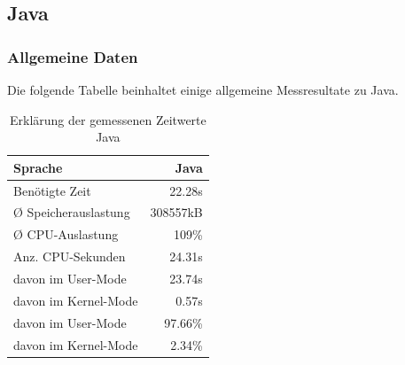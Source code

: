 \documentclass{fancydocument}
\begin{document}
\subsection{Java}
\subsubsection{Allgemeine Daten}
Die folgende Tabelle beinhaltet einige allgemeine Messresultate zu Java. 
\begin{table}[h!]
\centering
\begin{tabular}{|p{6cm}|r|} \hline
Sprache & Java\\
\hline
Benötigte Zeit & 22.28s\\
\hline
Ø Speicherauslastung & 308557kB\\
\hline
Ø CPU-Auslastung & 109\%\\
\hline
Anz. CPU-Sekunden & 24.31s\\
\hline
davon im User-Mode & 23.74s\\
\hline
davon im Kernel-Mode & 0.57s\\
\hline
davon im User-Mode & 97.66\%\\
\hline
davon im Kernel-Mode & 2.34\%\\
\hline
\end{tabular}
\caption{Erklärung der gemessenen Zeitwerte Java}
\end{table}
\end{document}
